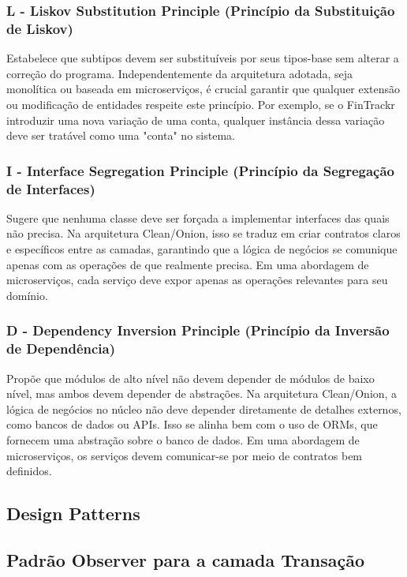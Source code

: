 \subsubsection*{L - Liskov Substitution Principle (Princípio da Substituição de Liskov)}
Estabelece que subtipos devem ser substituíveis por seus tipos-base sem alterar a correção do programa. Independentemente da arquitetura adotada, seja monolítica ou baseada em microserviços, é crucial garantir que qualquer extensão ou modificação de entidades respeite este princípio. Por exemplo, se o FinTrackr introduzir uma nova variação de uma conta, qualquer instância dessa variação deve ser tratável como uma "conta" no sistema.

\subsubsection*{I - Interface Segregation Principle (Princípio da Segregação de Interfaces)}
Sugere que nenhuma classe deve ser forçada a implementar interfaces das quais não precisa. Na arquitetura Clean/Onion, isso se traduz em criar contratos claros e específicos entre as camadas, garantindo que a lógica de negócios se comunique apenas com as operações de que realmente precisa. Em uma abordagem de microserviços, cada serviço deve expor apenas as operações relevantes para seu domínio.

\subsubsection*{D - Dependency Inversion Principle (Princípio da Inversão de Dependência)}
Propõe que módulos de alto nível não devem depender de módulos de baixo nível, mas ambos devem depender de abstrações. Na arquitetura Clean/Onion, a lógica de negócios no núcleo não deve depender diretamente de detalhes externos, como bancos de dados ou APIs. Isso se alinha bem com o uso de ORMs, que fornecem uma abstração sobre o banco de dados. Em uma abordagem de microserviços, os serviços devem comunicar-se por meio de contratos bem definidos.

\subsection{Design Patterns}

\subsection*{Padrão Observer para a camada Transação}


